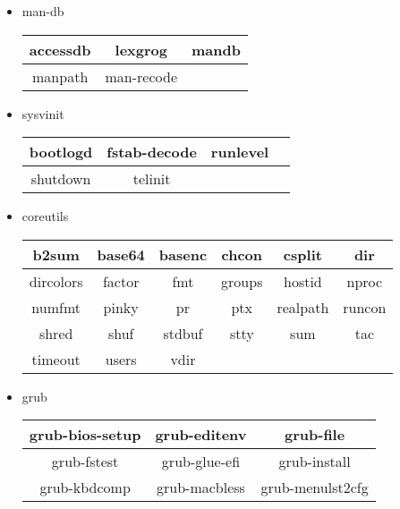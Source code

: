 \begin{itemize}
    \item man-db
        \begin{center}
            \begin{tabular}{|c|c|c|}
                \hline
                accessdb & lexgrog & mandb \\
                \hline
                manpath & man-recode \\
                \cline{1-2}
            \end{tabular}
        \end{center}
    \item sysvinit
        \begin{center}
            \begin{tabular}{|c|c|c|c|}
                \hline
                bootlogd & fstab-decode & runlevel \\
                \hline
                shutdown & telinit \\
                \cline{1-2}
            \end{tabular}
        \end{center}
    \item coreutils
        \begin{center}
            \begin{tabular}{|c|c|c|c|c|c|}
                \hline
                b2sum & base64 & basenc & chcon & csplit & dir \\
                \hline
                dircolors & factor & fmt & groups & hostid & nproc \\
                \hline
                numfmt & pinky & pr & ptx & realpath & runcon \\
                \hline
                shred & shuf & stdbuf & stty & sum & tac \\
                \hline
                timeout & users & vdir \\
                \cline{1-3}
            \end{tabular}
        \end{center}
    \item grub
        \begin{center}
            \begin{tabular}{|c|c|c|}
                \hline
                grub-bios-setup & grub-editenv & grub-file \\
                \hline
                grub-fstest & grub-glue-efi & grub-install \\
                \hline
                grub-kbdcomp & grub-macbless & grub-menulst2cfg \\

\end{tabular}
\end{center}
\end{itemize}
